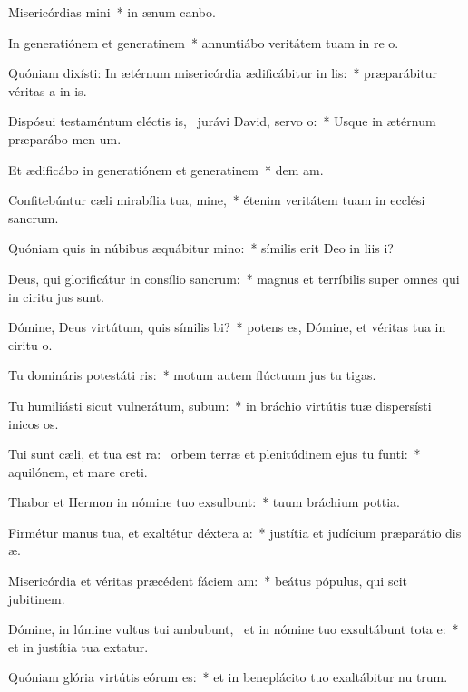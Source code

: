 \item Misericórdias mini~* in ænum canbo.
\item In generatiónem et generatinem~* annuntiábo veritátem tuam in re o.
\item Quóniam dixísti: In ætérnum misericórdia ædificábitur in lis:~* præparábitur véritas a in is.
\item Dispósui testaméntum eléctis is,~\pscross{} jurávi David, servo o:~* Usque in ætérnum præparábo men um.
\item Et ædificábo in generatiónem et generatinem~* dem am.
\item Confitebúntur cæli mirabília tua, mine,~* étenim veritátem tuam in ecclési sancrum.
\item Quóniam quis in núbibus æquábitur mino:~* símilis erit Deo in liis i?
\item Deus, qui glorificátur in consílio sancrum:~* magnus et terríbilis super omnes qui in ciritu jus sunt.
\item Dómine, Deus virtútum, quis símilis bi?~* potens es, Dómine, et véritas tua in ciritu o.
\item Tu domináris potestáti ris:~* motum autem flúctuum jus tu tigas.
\item Tu humiliásti sicut vulnerátum, subum:~* in bráchio virtútis tuæ dispersísti inicos os.
\item Tui sunt cæli, et tua est ra:~\pscross{} orbem terræ et plenitúdinem ejus tu funti:~* aquilónem, et mare  creti.
\item Thabor et Hermon in nómine tuo exsulbunt:~* tuum bráchium  pottia.
\item Firmétur manus tua, et exaltétur déxtera a:~* justítia et judícium præparátio dis æ.
\item Misericórdia et véritas præcédent fáciem am:~* beátus pópulus, qui scit jubitinem.
\item Dómine, in lúmine vultus tui ambubunt,~\pscross{} et in nómine tuo exsultábunt tota e:~* et in justítia tua extatur.
\item Quóniam glória virtútis eórum  es:~* et in beneplácito tuo exaltábitur nu trum.
